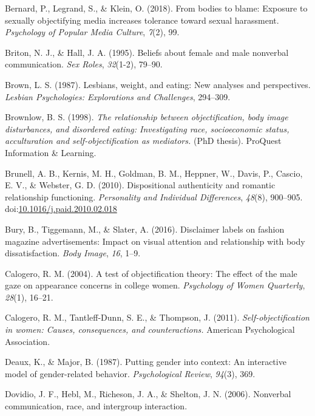 \documentclass[man]{apa6}
\begin{document}
\hypertarget{ref-bernard2018bodies}{}
Bernard, P., Legrand, S., \& Klein, O. (2018). From bodies to blame:
Exposure to sexually objectifying media increases tolerance toward
sexual harassment. \emph{Psychology of Popular Media Culture},
\emph{7}(2), 99.

\hypertarget{ref-briton1995}{}
Briton, N. J., \& Hall, J. A. (1995). Beliefs about female and male
nonverbal communication. \emph{Sex Roles}, \emph{32}(1-2), 79--90.

\hypertarget{ref-brown1987lesbians}{}
Brown, L. S. (1987). Lesbians, weight, and eating: New analyses and
perspectives. \emph{Lesbian Psychologies: Explorations and Challenges},
294--309.

\hypertarget{ref-brownlow1998relationship}{}
Brownlow, B. S. (1998). \emph{The relationship between objectification,
body image disturbances, and disordered eating: Investigating race,
socioeconomic status, acculturation and self-objectification as
mediators.} (PhD thesis). ProQuest Information \& Learning.

\hypertarget{ref-brunelletal2010}{}
Brunell, A. B., Kernis, M. H., Goldman, B. M., Heppner, W., Davis, P.,
Cascio, E. V., \& Webster, G. D. (2010). Dispositional authenticity and
romantic relationship functioning. \emph{Personality and Individual
Differences}, \emph{48}(8), 900--905.
doi:\href{https://doi.org/10.1016/j.paid.2010.02.018}{10.1016/j.paid.2010.02.018}

\hypertarget{ref-bury2016}{}
Bury, B., Tiggemann, M., \& Slater, A. (2016). Disclaimer labels on
fashion magazine advertisements: Impact on visual attention and
relationship with body dissatisfaction. \emph{Body Image}, \emph{16},
1--9.

\hypertarget{ref-calogero2004test}{}
Calogero, R. M. (2004). A test of objectification theory: The effect of
the male gaze on appearance concerns in college women. \emph{Psychology
of Women Quarterly}, \emph{28}(1), 16--21.

\hypertarget{ref-calogero2011}{}
Calogero, R. M., Tantleff-Dunn, S. E., \& Thompson, J. (2011).
\emph{Self-objectification in women: Causes, consequences, and
counteractions.} American Psychological Association.

\hypertarget{ref-deaux1987putting}{}
Deaux, K., \& Major, B. (1987). Putting gender into context: An
interactive model of gender-related behavior. \emph{Psychological
Review}, \emph{94}(3), 369.

\hypertarget{ref-dovidio2006nonverbal}{}
Dovidio, J. F., Hebl, M., Richeson, J. A., \& Shelton, J. N. (2006).
Nonverbal communication, race, and intergroup interaction.
\end{document}
